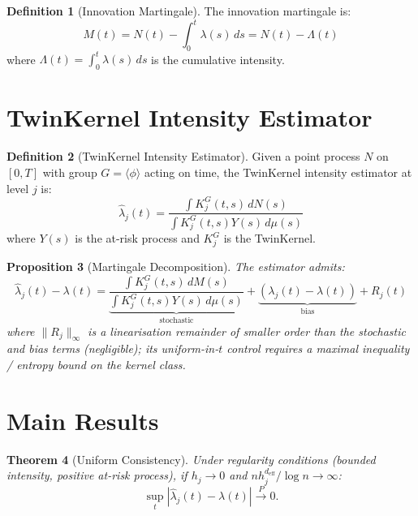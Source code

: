 \documentclass[11pt,twoside,openright]{book}
\theoremstyle{plain}
\newtheorem{theorem}{Theorem}[chapter]
\newtheorem{proposition}[theorem]{Proposition}
\theoremstyle{definition}
\newtheorem{definition}[theorem]{Definition}
\theoremstyle{remark}
\newcommand{\deff}{d_{\mathrm{eff}}}
\begin{document}
\begin{definition}[Innovation Martingale]
The innovation martingale is:
\begin{equation}
M(t) = N(t) - \int_0^t \lambda(s) \, ds = N(t) - \Lambda(t)
\label{eq:innovation-martingale}
\end{equation}
where $\Lambda(t) = \int_0^t \lambda(s) \, ds$ is the cumulative intensity.
\end{definition}

\section{TwinKernel Intensity Estimator}

\begin{definition}[TwinKernel Intensity Estimator]
Given a point process $N$ on $[0, T]$ with group $G = \langle \phi \rangle$ acting on time, the TwinKernel intensity estimator at level $j$ is:
\begin{equation}
\hat{\lambda}_j(t) = \frac{\int K_j^G(t, s) \, dN(s)}{\int K_j^G(t, s) Y(s) \, d\mu(s)}
\label{eq:twin-intensity}
\end{equation}
where $Y(s)$ is the at-risk process and $K_j^G$ is the TwinKernel.
\end{definition}

\begin{proposition}[Martingale Decomposition]
\label{prop:intensity-decomposition}
The estimator admits:
\begin{equation}
\hat{\lambda}_j(t) - \lambda(t) = \underbrace{\frac{\int K_j^G(t, s) \, dM(s)}{\int K_j^G(t, s) Y(s) \, d\mu(s)}}_{\text{stochastic}} + \underbrace{(\lambda_j(t) - \lambda(t))}_{\text{bias}} + R_j(t)
\label{eq:intensity-decomposition}
\end{equation}
where $\|R_j\|_\infty$ is a linearisation remainder of \emph{smaller order} than the stochastic and bias terms (negligible); its uniform-in-$t$ control requires a maximal inequality / entropy bound on the kernel class.
\end{proposition}

\section{Main Results}

\begin{theorem}[Uniform Consistency]
\label{thm:intensity-consistency}
Under regularity conditions (bounded intensity, positive at-risk process), if $h_j \to 0$ and $nh_j^{\deff}/\log n \to \infty$:
\begin{equation}
\sup_t |\hat{\lambda}_j(t) - \lambda(t)| \xrightarrow{P} 0.
\label{eq:intensity-consistency}
\end{equation}
\end{theorem}
\end{document}
